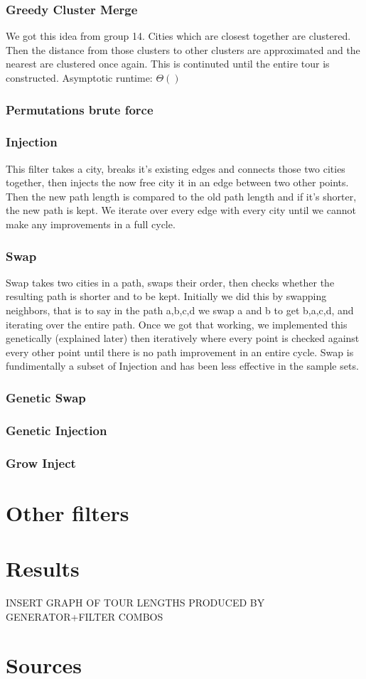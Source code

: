 \documentclass{article}
\begin{document}
\section*{Greedy Cluster Merge}%
We got this idea from group 14. Cities which are closest together are clustered. Then the distance from those clusters to other clusters are approximated and the nearest are clustered once again. This is continuted until the entire tour is constructed. Asymptotic runtime: $\Theta ()$ 
\section*{Permutations brute force}%

\section*{Injection}%
This filter takes a city, breaks it's existing edges and connects those two cities together, then injects the now free city it in an edge between two other points. Then the new path length is compared to the old path length and if it's shorter, the new path is kept. We iterate over every edge with every city until we cannot make any improvements in a full cycle.

\section*{Swap}%
Swap takes two cities in a path, swaps their order, then checks whether the resulting path is shorter and to be kept. Initially we did this by swapping neighbors, that is to say in the path a,b,c,d we swap a and b to get b,a,c,d, and iterating over the entire path. Once we got that working, we implemented this genetically (explained later) then iteratively where every point is checked against every other point until there is no path improvement in an entire cycle. Swap is fundimentally a subset of Injection and has been less effective in the sample sets.

\section*{Genetic Swap}%


\section*{Genetic Injection}%


\section*{Grow Inject}%


\part*{Other filters}

\part*{Results}
INSERT GRAPH OF TOUR LENGTHS PRODUCED BY GENERATOR+FILTER COMBOS


\part*{Sources}
\end{document}
